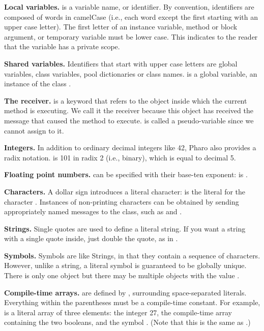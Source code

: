 \documentclass[10pt,twoside,english]{_support/latex/sbabook/sbabook}
\begin{document}
\textbf{Local variables.}  is a variable name, or identifier. By
convention, identifiers are composed of words in camelCase (i.e., each word
except the first starting with an upper case letter). The first letter of an
instance variable, method or block argument, or temporary variable must be lower
case. This indicates to the reader that the variable has a private scope.

\textbf{Shared variables.} Identifiers that start with upper case letters are global
variables, class variables, pool dictionaries or class names.  is
a global variable, an instance of the class .

\textbf{The receiver.}  is a keyword that refers to the object inside which
the current method is executing. We call it the receiver because this object has
received the message that caused the method to execute.
 is called a pseudo-variable since we cannot assign to it.

\textbf{Integers.} In addition to ordinary decimal integers like 42, Pharo also
provides a radix notation.  is 101 in radix 2 (i.e., binary), which is
equal to decimal 5.

\textbf{Floating point numbers.} can be specified with their base-ten exponent:
 is .

\textbf{Characters.} A dollar sign introduces a literal character:  is the
literal for the character . Instances of non-printing characters can be
obtained by sending appropriately named messages to the  class,
such as  and .

\textbf{Strings.} Single quotes  are used to define a literal string. If you
want a string with a single quote inside, just double the quote, as in
.

\textbf{Symbols.} Symbols are like Strings, in that they contain a sequence of characters.
However, unlike a string, a literal symbol is guaranteed to be globally unique.
There is only one  object  but there may be multiple
 objects with the value .

\textbf{Compile-time arrays.} are defined by \textcode{\#( )}, surrounding space-separated
literals. Everything within the parentheses must be a compile-time constant. For
example,  is a literal array of three elements: the
integer 27, the compile-time array containing the two booleans, and the symbol
. (Note that this is the same as .)
\end{document}
